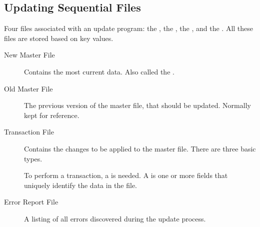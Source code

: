 \documentclass[\main/notes.tex]{subfiles}
\begin{document}
			\subsection{Updating Sequential Files}
				Four files associated with an update program: the , the , the , and the . All these files are stored based on key values.
				\begin{indentparagraph}
					\begin{description}
						\item[New Master File] Contains the most current data. Also called the .
						\item[Old Master File] The previous version of the master file, that should be updated. Normally kept for reference.
						\item[Transaction File] Contains the changes to be applied to the master file. There are three basic types.
							\begin{indentparagraph}
							\end{indentparagraph}
							To perform a transaction, a \concept{key} is needed. A  is one or more fields that uniquely identify the data in the file.
						\item[Error Report File] A listing of all errors discovered during the update process.
					\end{description}
				\end{indentparagraph}
\end{document}
